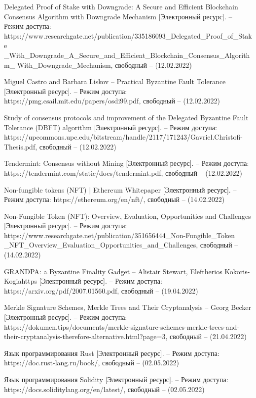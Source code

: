\begin{thebibliography}{}
	Delegated Proof of Stake with Downgrade: A Secure and Efficient Blockchain Consensus Algorithm with Downgrade Mechanism [Электронный ресурс]. -- Режим доступа: https://www.researchgate.net/publication/335186093\_Delegated\_Proof\_of\_Stake
	\_With\_Downgrade\_A\_Secure\_and\_Efficient\_Blockchain\_Consensus\_Algorithm\_
	With\_Downgrade\_Mechanism, свободный -- (12.02.2022)
	
	Miguel Castro and Barbara Liskov -- Practical Byzantine Fault Tolerance [Электронный ресурс]. -- Режим доступа: https://pmg.csail.mit.edu/papers/osdi99.pdf, свободный -- (12.02.2022)
	
	Study of consensus protocols and improvement of the Delegated Byzantine Fault Tolerance (DBFT) algorithm [Электронный ресурс]. -- Режим доступа: https://upcommons.upc.edu/bitstream/handle/2117/171243/Gavriel.Christofi-Thesis.pdf, свободный -- (12.02.2022)
	
	Tendermint: Consensus without Mining [Электронный ресурс]. -- Режим доступа: https://tendermint.com/static/docs/tendermint.pdf, свободный -- (12.02.2022)
	
	Non-fungible tokens (NFT) | Ethereum Whitepaper [Электронный ресурс]. -- Режим доступа: 
	https://ethereum.org/en/nft/,
	свободный -- (14.02.2022)
	
	Non-Fungible Token (NFT): Overview, Evaluation, Opportunities and Challenges [Электронный ресурс]. -- Режим доступа: https://www.researchgate.net/publication/351656444\_Non-Fungible\_Token
	\_NFT\_Overview\_Evaluation\_Opportunities\_and\_Challenges, свободный -- (14.02.2022)
	
	GRANDPA: a Byzantine Finality Gadget -- Alistair Stewart, Eleftherios Kokoris-Kogiahttps [Электронный ресурс]. -- Режим доступа: https://arxiv.org/pdf/2007.01560.pdf, свободный -- (19.04.2022)

	Merkle Signature Schemes, Merkle Trees and Their Cryptanalysis -- Georg Becker [Электронный ресурс]. -- Режим доступа: https://dokumen.tips/documents/merkle-signature-schemes-merkle-trees-and-their-cryptanalysis-therefore-alternative.html?page=3, свободный -- (21.04.2022)
	
	Язык программирования Rust [Электронный ресурс]. -- Режим доступа: https://doc.rust-lang.ru/book/, свободный -- (02.05.2022)
	
	Язык программирования Solidity [Электронный ресурс]. -- Режим доступа: https://docs.soliditylang.org/en/latest/, свободный -- (02.05.2022)
	

\end{thebibliography}
